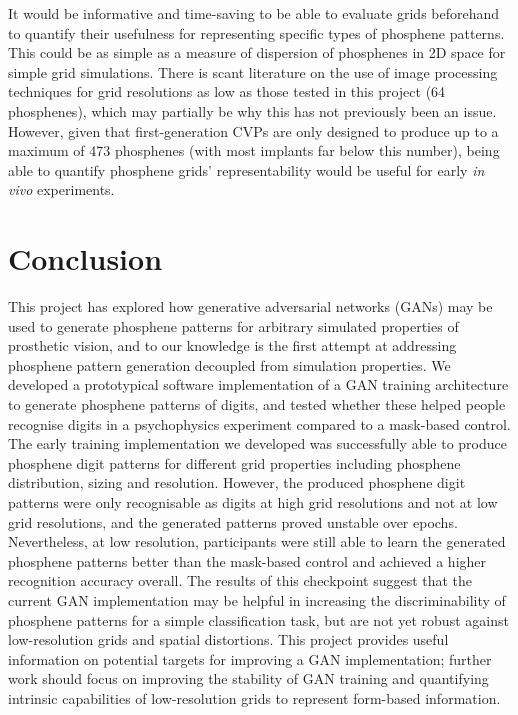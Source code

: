 \documentclass[a4paper,11pt,openany]{book}
\begin{document}
It would be informative and time-saving to be able to evaluate grids beforehand to quantify their usefulness for representing specific types of phosphene patterns.
This could be as simple as a measure of dispersion of phosphenes in 2D space for simple grid simulations.
There is scant literature on the use of image processing techniques for grid resolutions as low as those tested in this project (64 phosphenes), which may partially be why this has not previously been an issue.
However, given that first-generation CVPs are only designed to produce up to a maximum of 473 phosphenes (with most implants far below this number), being able to quantify phosphene grids' representability would be useful for early \emph{in vivo} experiments.

\chapter{Conclusion}
\label{sec:org870f29d}

This project has explored how generative adversarial networks (GANs) may be used to generate phosphene patterns for arbitrary simulated properties of prosthetic vision, and to our knowledge is the first attempt at addressing phosphene pattern generation decoupled from simulation properties. 
We developed a prototypical software implementation of a GAN training architecture to generate phosphene patterns of digits, and tested whether these helped people recognise digits in a psychophysics experiment compared to a mask-based control.
The early training implementation we developed was successfully able to produce phosphene digit patterns for different grid properties including phosphene distribution, sizing and resolution.
However, the produced phosphene digit patterns were only recognisable as digits at high grid resolutions and not at low grid resolutions, and the generated patterns proved unstable over epochs.
Nevertheless, at low resolution, participants were still able to learn the generated phosphene patterns better than the mask-based control and achieved a higher recognition accuracy overall.
The results of this checkpoint suggest that the current GAN implementation may be helpful in increasing the discriminability of phosphene patterns for a simple classification task, but are not yet robust against low-resolution grids and spatial distortions.
This project provides useful information on potential targets for improving a GAN implementation; further work should focus on improving the stability of GAN training and quantifying intrinsic capabilities of low-resolution grids to represent form-based information.
\end{document}
